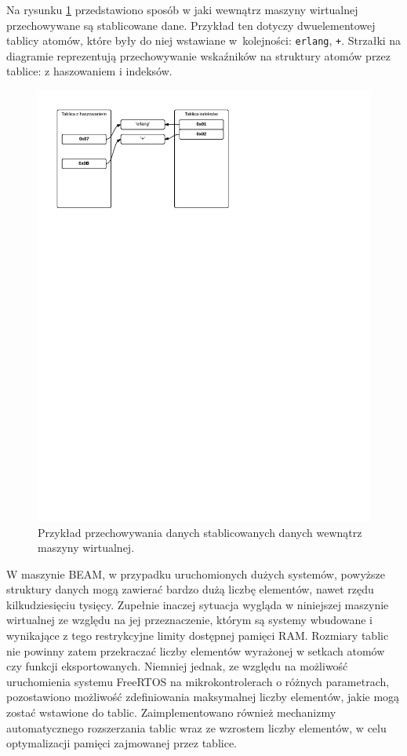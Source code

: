 Na rysunku \ref{fig:atomtable} przedstawiono sposób w jaki wewnątrz maszyny wirtualnej przechowywane są stablicowane dane.  Przykład ten dotyczy dwuelementowej tablicy atomów, które były do niej wstawiane w~kolejności: \texttt{erlang}, \texttt{+}. Strzałki na diagramie reprezentują przechowywanie wskaźników na struktury atomów przez tablice: z haszowaniem i indeksów.

\begin{figure}[h]
\centerline{\includegraphics[scale=1, clip, trim=0 200mm 90mm 0]{atom_table}}
\caption{Przykład przechowywania danych stablicowanych danych wewnątrz maszyny wirtualnej.}
\label{fig:atomtable}
\end{figure}

W maszynie BEAM, w przypadku uruchomionych dużych systemów, powyższe struktury danych mogą zawierać bardzo dużą liczbę elementów, nawet rzędu kilkudziesięciu tysięcy. Zupełnie inaczej sytuacja wygląda w niniejszej maszynie wirtualnej ze względu na jej przeznaczenie, którym są systemy wbudowane i wynikające z tego restrykcyjne limity dostępnej pamięci RAM. Rozmiary tablic nie powinny zatem przekraczać liczby elementów wyrażonej w setkach atomów czy funkcji eksportowanych. Niemniej jednak, ze względu na możliwość uruchomienia systemu FreeRTOS na mikrokontrolerach o różnych parametrach, pozostawiono możliwość zdefiniowania maksymalnej liczby elementów, jakie mogą zostać wstawione do tablic. Zaimplementowano również mechanizmy automatycznego rozszerzania tablic wraz ze wzrostem liczby elementów, w celu optymalizacji pamięci zajmowanej przez tablice.

